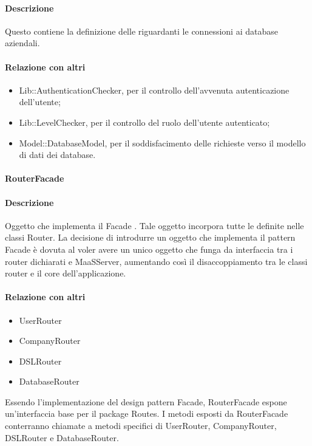 \paragraph*{Descrizione}
Questo  contiene la definizione delle  riguardanti le connessioni ai database aziendali.

\paragraph*{Relazione con altri }
\begin{itemize}
\item Lib::AuthenticationChecker, per il controllo dell'avvenuta autenticazione dell'utente;
\item Lib::LevelChecker, per il controllo del ruolo dell'utente autenticato;
\item Model::DatabaseModel, per il soddisfacimento delle richieste verso il modello di dati dei database.
\end{itemize}

\paragraph{RouterFacade}
\paragraph*{Descrizione}
Oggetto che implementa il Facade . Tale oggetto incorpora tutte le  definite nelle classi Router.
La decisione di introdurre un oggetto che implementa il pattern Facade è dovuta al voler avere un unico oggetto che funga da interfaccia tra i router dichiarati e MaaSServer, aumentando così il disaccoppiamento tra le classi router e il core dell'applicazione.  

\paragraph*{Relazione con altri }
\begin{itemize}
\item UserRouter
\item CompanyRouter
\item DSLRouter
\item DatabaseRouter
\end{itemize}
Essendo l'implementazione del design pattern Facade, RouterFacade espone un'interfaccia base per il package Routes. I metodi esposti da RouterFacade conterranno chiamate a metodi specifici di UserRouter, CompanyRouter, DSLRouter e DatabaseRouter.

